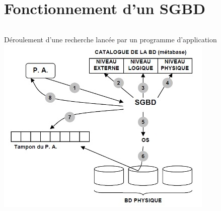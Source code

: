 \documentclass[10pt]{beamer}
\begin{document}
\section{Fonctionnement d’un SGBD}
\begin{frame}{\secname }
    \begin{columns}
        Déroulement d’une recherche lancée par un programme d’application
        \includegraphics[width=0.8\linewidth]{../assets/img/architecture_sgbd--7.jpg}
    \end{columns}
\end{frame}


\end{document}
